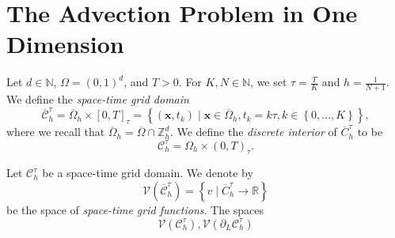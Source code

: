 \section{The Advection Problem in One Dimension}

\begin{frame}
    \begin{definition}
        Let $d\in\mathbb{N}$, $\Omega=\left(0,1\right)^{d}$, and $T>0$.
        For $K, N\in\mathbb{N}$, we set $\tau=\frac{T}{K}$ and
        $h=\frac{1}{N+1}$.
        We define the \emph{space-time grid domain}
        \begin{equation*}
            \overline{\mathcal{C}}^{\tau}_{h}=
            \overline{\Omega}_{h}\times
            {\left[0,T\right]}_{\tau}=
            \left\{
            \left(\mathbf{x},t_{k}\right)\mid
            \mathbf{x}\in\overline{\Omega}_{h},
            t_{k}=k\tau,
            k\in\left\{0,\dotsc,K\right\}
            \right\},
        \end{equation*}
        where we recall that
        \begin{math}
            \overline{\Omega}_{h}=
            \overline{\Omega}\cap
            \mathbb{Z}^{d}_{h}
        \end{math}.
        We define the \emph{discrete interior} of $\overline{C}^{\tau}_{h}$ to be
        \begin{equation*}
            \mathcal{C}^{\tau}_{h}=\Omega_{h}\times
            \left(0,T\right)_{\tau}.
        \end{equation*}
    \end{definition}

    \begin{definition}
        Let $\mathcal{C}^{\tau}_{h}$ be a space-time grid domain.
        We denote by
        \begin{equation*}
            \mathcal{V}
            \left(
            \overline{\mathcal{C}}^{\tau}_{h}
            \right)=
            \left\{
            v\mid
            \overline{C}^{\tau}_{h}\to\mathbb{R}
            \right\}
        \end{equation*}
        be the space of \emph{space-time grid functions}.
        The spaces
        \begin{equation*}
            \mathcal{V}
            \left(
            \mathcal{C}^{\tau}_{h}
            \right),
            \mathcal{V}
            \left(
            \partial_{L}\mathcal{C}^{\tau}_{h}
            \right)
        \end{equation*}
    \end{definition}
\end{frame}


